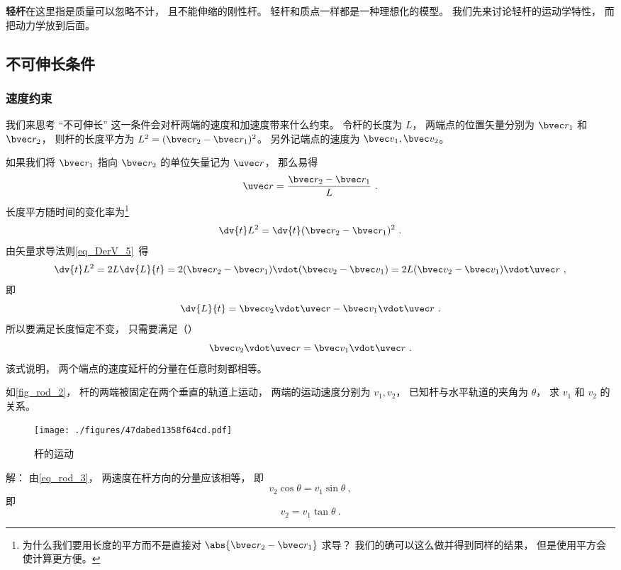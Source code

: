 

\textbf{轻杆}在这里指是质量可以忽略不计， 且不能伸缩的刚性杆。 轻杆和质点一样都是一种理想化的模型。 我们先来讨论轻杆的运动学特性， 而把动力学放到后面。

\subsection{不可伸长条件}
\subsubsection{速度约束}
我们来思考 “不可伸长” 这一条件会对杆两端的速度和加速度带来什么约束。 令杆的长度为 $L$， 两端点的位置矢量分别为 $\bvec r_1$ 和 $\bvec r_2$， 则杆的长度平方为 $L^2 = (\bvec r_2 - \bvec r_1)^2$。 另外记端点的速度为 $\bvec v_1, \bvec v_2$。

如果我们将 $\bvec r_1$ 指向 $\bvec r_2$ 的单位矢量记为 $\uvec r$， 那么易得
\begin{equation}\label{eq_rod_7}
\uvec r = \frac{\bvec r_2 - \bvec r_1}{L}~.
\end{equation}
长度平方随时间的变化率为\footnote{为什么我们要用长度的平方而不是直接对 $\abs{\bvec r_2 - \bvec r_1}$ 求导？ 我们的确可以这么做并得到同样的结果， 但是使用平方会使计算更方便。}
\begin{equation}\label{eq_rod_2}
\dv{t} L^2 = \dv{t} (\bvec r_2 - \bvec r_1)^2~.
\end{equation}
由矢量求导法则\autoref{eq_DerV_5}~得
\begin{equation}\label{eq_rod_1}
\dv{t} L^2 = 2L \dv{L}{t} = 2 (\bvec r_2 - \bvec r_1) \vdot (\bvec v_2 - \bvec v_1) = 2L (\bvec v_2 - \bvec v_1) \vdot \uvec r~,
\end{equation}
即
\begin{equation}\label{eq_rod_6}
\dv{L}{t} = \bvec v_2 \vdot \uvec r - \bvec v_1 \vdot \uvec r~.
\end{equation}
所以要满足长度恒定不变， 只需要满足（）
\begin{equation}\label{eq_rod_3}
\bvec v_2 \vdot \uvec r = \bvec v_1 \vdot \uvec r~.
\end{equation}
该式说明， 两个端点的速度延杆的分量在任意时刻都相等。

\begin{example}{}\label{ex_rod_1}
如\autoref{fig_rod_2}， 杆的两端被固定在两个垂直的轨道上运动， 两端的运动速度分别为 $v_1, v_2$， 已知杆与水平轨道的夹角为 $\theta$， 求 $v_1$ 和 $v_2$ 的关系。
\begin{figure}[ht]
\centering
\texttt{[image: ./figures/47dabed1358f64cd.pdf]}
\caption{杆的运动} \label{fig_rod_1}
\end{figure}
解： 由\autoref{eq_rod_3}， 两速度在杆方向的分量应该相等， 即
\begin{equation}
v_2 \cos\theta = v_1 \sin\theta~,
\end{equation}
即
\begin{equation}
v_2 = v_1 \tan\theta~.
\end{equation}
\end{example}

